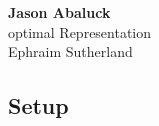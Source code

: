 
\usepackage[font=scriptsize]{caption}



\begin{center}
	{\large \bf Jason Abaluck }   \\ \large optimal Representation \\ Ephraim Sutherland
\end{center}

\tableofcontents




\subsection*{Setup}


